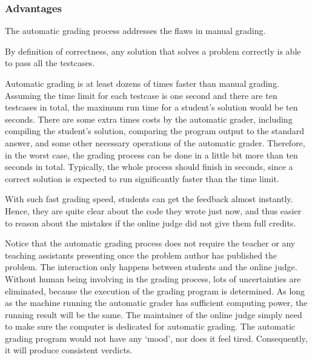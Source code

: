         \subsubsection{Advantages}

            The automatic grading process addresses the flaws in manual grading.

            By definition of correctness, any solution that solves a problem correctly
            is able to pass all the testcases.

            Automatic grading is at least dozens of times faster than manual grading.
            Assuming the time limit for each testcase is one second and there are ten testcases in total,
            the maximum run time for a student's solution would be ten seconds.
            There are some extra times costs by the automatic grader, including
            compiling the student's solution, comparing the program output to the standard answer,
            and some other necessary operations of the automatic grader.
            Therefore, in the worst case,
            the grading process can be done in a little bit more than ten seconds in total.
            Typically, the whole process should finish in seconds,
            since a correct solution is expected to run significantly faster than the time limit.

            With such fast grading speed, students can get the feedback almost instantly.
            Hence, they are quite clear about the code they wrote just now, and thus easier to 
            reason about the mistakes if the online judge did not give them full credits.

            Notice that the automatic grading process does not require
            the teacher or any teaching assistants presenting
            once the problem author has published the problem.
            The interaction only happens between students and the online judge.
            Without human being involving in the grading process,
            lots of uncertainties are eliminated,
            because the execution of the grading program is determined.
            As long as the machine running the automatic grader has sufficient computing power,
            the running result will be the same.
            The maintainer of the online judge simply need to
            make sure the computer is dedicated for automatic grading.
            The automatic grading program would not have any `mood', nor does it feel tired.
            Consequently, it will produce consistent verdicts.

